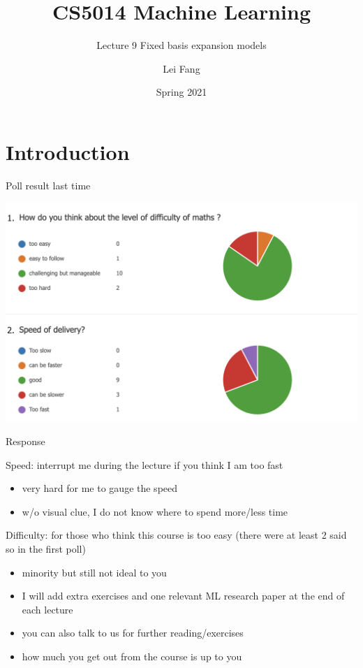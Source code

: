 \documentclass[ignorenonframetext,aspectratio=169]{beamer}
\title{CS5014 Machine Learning}
\subtitle{Lecture 9 Fixed basis expansion models}
\author{Lei Fang}
\date{Spring 2021}
\providecommand{\tightlist}{%
  \setlength{\itemsep}{0pt}\setlength{\parskip}{0pt}}
\begin{document}
\frame{\titlepage}

\hypertarget{introduction}{%
\section{Introduction}\label{introduction}}

\begin{frame}{Poll result last time}
\protect\hypertarget{poll-result-last-time}{}

\begin{center}\includegraphics[width=0.8\linewidth]{./figs/lec6poll} \end{center}

\end{frame}

\begin{frame}{Response}
\protect\hypertarget{response}{}

Speed: interrupt me during the lecture if you think I am too fast

\begin{itemize}
\tightlist
\item
  very hard for me to gauge the speed
\item
  w/o visual clue, I do not know where to spend more/less time
\end{itemize}

\bigskip

Difficulty: for those who think this course is too easy (there were at
least 2 said so in the first poll)

\begin{itemize}
\tightlist
\item
  minority but still not ideal to you
\item
  I will add extra exercises and one relevant ML research paper at the
  end of each lecture
\item
  you can also talk to us for further reading/exercises
\item
  how much you get out from the course is up to you
\end{itemize}

\end{frame}
\end{document}
